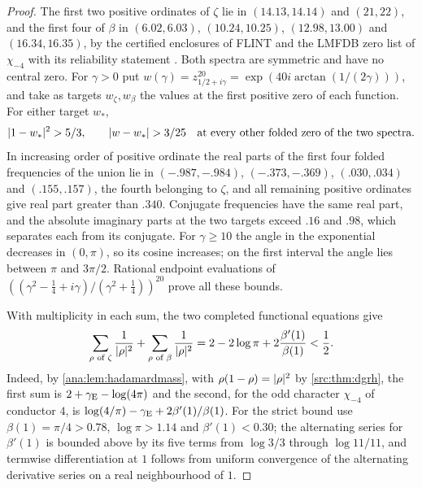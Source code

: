 \begin{proof}
The first two positive ordinates of $\zeta$ lie in $(14.13,14.14)$ and $(21,22)$, and the first four of $\beta$ in
$(6.02,6.03)$, $(10.24,10.25)$, $(12.98,13.00)$ and $(16.34,16.35)$, by the certified enclosures of FLINT
\cite{FLINTZetaZeros} and the LMFDB zero list of $\chi_{-4}$ with its reliability statement \cite{LMFDBDirichletBeta}. Both
spectra are symmetric and have no central zero. For $\gamma>0$ put $w(\gamma)=z_{1/2+i\gamma}^{20}=\exp(40i\arctan(1/(2\gamma)))$, and
take as targets $w_\zeta,w_\beta$ the values at the first positive zero of each function. For either target $w_*$,
\begin{equation}\label{rec:eq:boxes}
 \lvert1-w_*\rvert^2>5/3,\qquad\lvert w-w_*\rvert>3/25\quad\text{at every other folded zero of the two spectra}.
\end{equation}
In increasing order of positive ordinate the real parts of the first four folded frequencies of the union lie in
$(-.987,-.984)$, $(-.373,-.369)$, $(.030,.034)$ and $(.155,.157)$, the fourth belonging to $\zeta$, and all remaining
positive ordinates give real part greater than $.340$. Conjugate frequencies have the same real part, and the
absolute imaginary parts at the two targets exceed $.16$ and $.98$, which separates each from its conjugate. For
$\gamma\ge10$ the angle in the exponential decreases in $(0,\pi)$, so its cosine increases; on the first interval the angle
lies between $\pi$ and $3\pi/2$. Rational endpoint evaluations of $((\gamma^2-\frac14+i\gamma)/(\gamma^2+\frac14))^{20}$ prove all these
bounds.

With multiplicity in each sum, the two completed functional equations give
\begin{equation}\label{rec:eq:bothmass}
 \sum_{\rho\text{ of }\zeta}\frac1{\lvert\rho\rvert^2}+\sum_{\rho\text{ of }\beta}\frac1{\lvert\rho\rvert^2}=2-2\log\pi+2\frac{\beta'(1)}{\beta(1)}<\frac12 .
\end{equation}
Indeed, by \cref{ana:lem:hadamardmass}, with $\rho(1-\rho)=\lvert\rho\rvert^2$ by \cref{src:thm:dgrh}, the first sum is
$2+\gamma_{\mathrm{E}}-\log(4\pi)$ and the second, for the odd character $\chi_{-4}$ of conductor $4$, is
$\log(4/\pi)-\gamma_{\mathrm{E}}+2\beta'(1)/\beta(1)$. For the
strict bound use $\beta(1)=\pi/4>0.78$, $\log\pi>1.14$ and $\beta'(1)<0.30$; the alternating series for $\beta'(1)$ is bounded above
by its five terms from $\log3/3$ through $\log11/11$, and termwise differentiation at $1$ follows from uniform
convergence of the alternating derivative series on a real neighbourhood of $1$.


\end{proof}
